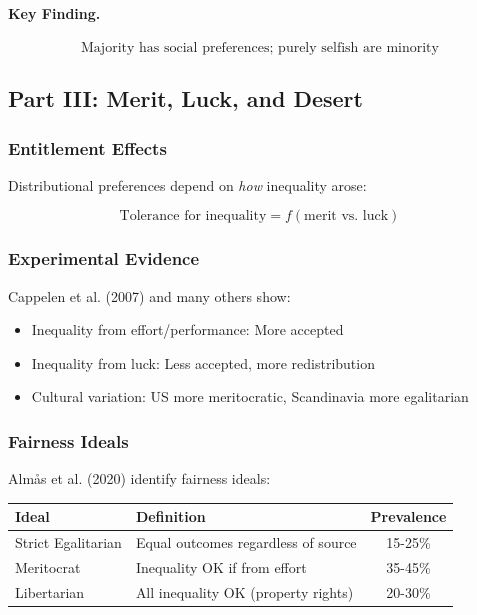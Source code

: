 \paragraph{Key Finding.}
\begin{equation}
\boxed{
\text{Majority has social preferences; purely selfish are minority}
}
\end{equation}

\subsection{Part III: Merit, Luck, and Desert}

\subsubsection{Entitlement Effects}

Distributional preferences depend on \textit{how} inequality arose:

\begin{equation}
\boxed{
\text{Tolerance for inequality} = f(\text{merit vs. luck})
}
\label{eq:merit}
\end{equation}

\subsubsection{Experimental Evidence}

Cappelen et al. (2007) and many others show:
\begin{itemize}
    \item Inequality from effort/performance: More accepted
    \item Inequality from luck: Less accepted, more redistribution
    \item Cultural variation: US more meritocratic, Scandinavia more egalitarian
\end{itemize}

\subsubsection{Fairness Ideals}

Almås et al. (2020) identify fairness ideals:

\begin{center}
\renewcommand{\arraystretch}{1.3}
\begin{tabular}{|l|l|c|}
\hline
\textbf{Ideal} & \textbf{Definition} & \textbf{Prevalence} \\
\hline
Strict Egalitarian & Equal outcomes regardless of source & 15-25\% \\
Meritocrat & Inequality OK if from effort & 35-45\% \\
Libertarian & All inequality OK (property rights) & 20-30\% \\
\hline
\end{tabular}
\end{center}

